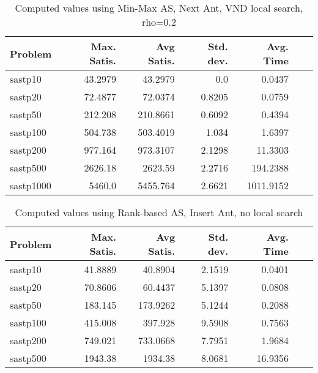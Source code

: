 \documentclass{article}
\begin{document}
\begin{table}[b!]
  \caption{Computed values using Min-Max AS, Next Ant, VND local search, rho=0.2}
  \label{tab:conf8}
  \setlength{\tabcolsep}{1.4mm}
  \centering
  \begin{tabular}{lrrrrrr}
    \bfseries Problem &
    \bfseries Max. Satis. &
    \bfseries Avg Satis. &
    \bfseries Std. dev. &
    \bfseries Avg. Time 
    \\\hline
  sastp10 & 43.2979 & 43.2979 & 0.0 & 0.0437 \\ 
  sastp20 & 72.4877 & 72.0374 & 0.8205 & 0.0759 \\ 
  sastp50 & 212.208 & 210.8661 & 0.6092 & 0.4394 \\ 
  sastp100 & 504.738 & 503.4019 & 1.034 & 1.6397 \\ 
  sastp200 & 977.164 & 973.3107 & 2.1298 & 11.3303 \\ 
  sastp500 & 2626.18 & 2623.59 & 2.2716 & 194.2388 \\ 
  sastp1000 & 5460.0 & 5455.764 & 2.6621 & 1011.9152
    \\\hline
  \end{tabular}

\end{table}

\begin{table}[b!]
  \caption{Computed values using Rank-based AS, Insert Ant, no local search}
  \label{tab:conf9}
  \setlength{\tabcolsep}{1.4mm}
  \centering
  \begin{tabular}{lrrrrrr}
    \bfseries Problem &
    \bfseries Max. Satis. &
    \bfseries Avg Satis. &
    \bfseries Std. dev. &
    \bfseries Avg. Time 
    \\\hline
    sastp10 & 41.8889 & 40.8904 & 2.1519 & 0.0401 \\ 
    sastp20 & 70.8606 & 60.4437 & 5.1397 & 0.0808 \\ 
    sastp50 & 183.145 & 173.9262 & 5.1244 & 0.2088 \\ 
    sastp100 & 415.008 & 397.928 & 9.5908 & 0.7563 \\ 
    sastp200 & 749.021 & 733.0668 & 7.7951 & 1.9684 \\ 
    sastp500 & 1943.38 & 1934.38 & 8.0681 & 16.9356
    \\\hline
  \end{tabular}

\end{table}


\end{document}
